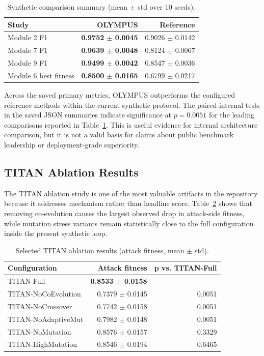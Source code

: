 \documentclass[conference]{IEEEtran}
\begin{document}
\begin{table}[h]
\centering
\caption{Synthetic comparison summary (mean $\pm$ std over 10 seeds).}
\label{tab:synthetic_summary}
\begin{tabular}{lrr}
\toprule
Study & OLYMPUS & Reference \\
\midrule
Module 2 F1 & \textbf{0.9752 $\pm$ 0.0045} & 0.9026 $\pm$ 0.0142 \\
Module 7 F1 & \textbf{0.9639 $\pm$ 0.0048} & 0.8124 $\pm$ 0.0067 \\
Module 9 F1 & \textbf{0.9499 $\pm$ 0.0042} & 0.8547 $\pm$ 0.0036 \\
Module 6 best fitness & \textbf{0.8500 $\pm$ 0.0165} & 0.6799 $\pm$ 0.0217 \\
\bottomrule
\end{tabular}
\end{table}

Across the saved primary metrics, OLYMPUS outperforms the configured reference
methods within the current synthetic protocol. The paired internal tests in the
saved JSON summaries indicate significance at $p = 0.0051$ for the leading
comparisons reported in Table~\ref{tab:synthetic_summary}. This is useful evidence
for internal architecture comparison, but it is not a valid basis for claims
about public benchmark leadership or deployment-grade superiority.

\subsection{TITAN Ablation Results}

The TITAN ablation study is one of the most valuable artifacts in the repository
because it addresses mechanism rather than headline score. Table~\ref{tab:titan_ablation}
shows that removing co-evolution causes the largest observed drop in attack-side
fitness, while mutation stress variants remain statistically close to the full
configuration inside the present synthetic loop.

\begin{table}[h]
\centering
\caption{Selected TITAN ablation results (attack fitness, mean $\pm$ std).}
\label{tab:titan_ablation}
\begin{tabular}{lrr}
\toprule
Configuration & Attack fitness & p vs. TITAN-Full \\
\midrule
TITAN-Full & \textbf{0.8533 $\pm$ 0.0158} & -- \\
TITAN-NoCoEvolution & 0.7379 $\pm$ 0.0145 & 0.0051 \\
TITAN-NoCrossover & 0.7742 $\pm$ 0.0158 & 0.0051 \\
TITAN-NoAdaptiveMut & 0.7982 $\pm$ 0.0148 & 0.0051 \\
TITAN-NoMutation & 0.8576 $\pm$ 0.0157 & 0.3329 \\
TITAN-HighMutation & 0.8546 $\pm$ 0.0194 & 0.6465 \\
\bottomrule
\end{tabular}
\end{table}
\end{document}
